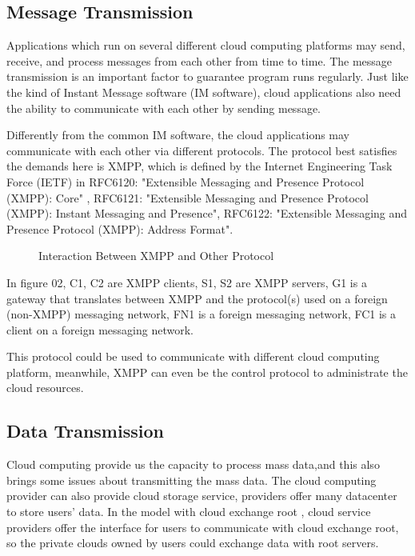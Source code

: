 \documentclass[conference]{IEEEtran}
\begin{document}
\subsection{Message Transmission}
Applications which run on several different cloud computing platforms may send, receive, and process messages from each other from time to time. The message transmission is an important factor to guarantee program runs regularly. Just like the kind of Instant Message software (IM software), cloud applications also need the ability to communicate with each other by sending message.

Differently from the common IM software, the cloud applications may communicate with each other via different protocols. The protocol best satisfies the demands here is XMPP, which is defined by the Internet Engineering Task Force (IETF) in RFC6120: "Extensible Messaging and Presence Protocol (XMPP): Core"\cite{RFC6120} , RFC6121: "Extensible Messaging and Presence Protocol (XMPP): Instant Messaging and Presence"\cite{RFC6121}, RFC6122: "Extensible Messaging and Presence Protocol (XMPP): Address Format".\cite{RFC6122}

\begin{figure}[h]
\centering
{}
\caption{Interaction Between XMPP and Other Protocol\cite{RFC6120} }
\label{fig_02}
\end{figure}

In figure 02, C1, C2 are XMPP clients, S1, S2  are XMPP servers, G1 is a gateway that translates between XMPP and the protocol(s) used on a foreign (non-XMPP) messaging network, FN1 is a foreign messaging network, FC1 is a client on a foreign messaging network.\cite{RFC6120} 

This protocol could be used to communicate with different cloud computing platform, meanwhile, XMPP can even be the control protocol to administrate the cloud resources.


\subsection{Data Transmission}
Cloud computing provide us the capacity to process mass data,and this also brings some issues about transmitting the mass data. The cloud computing provider can also provide cloud storage service, providers offer many datacenter to store users' data. In the model with cloud exchange root\cite{intercloud_root} , cloud service providers offer the interface for users to communicate with cloud exchange root, so the private clouds owned by users could exchange data with root servers.
\end{document}
